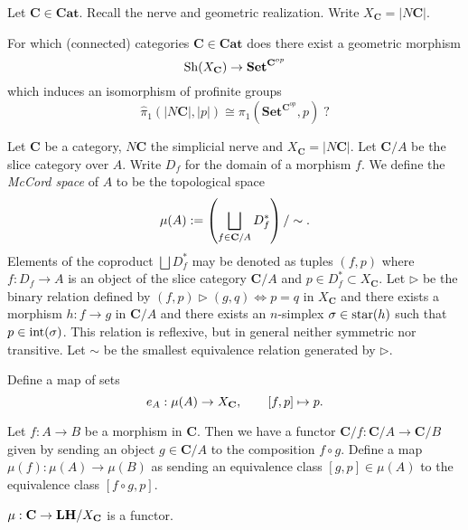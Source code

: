 %
%





Let $\mathbf{C} \in \mathbf{Cat}$. Recall the nerve and geometric realization.
Write $X_\mathbf{C} = |N\mathbf{C}|$.
\begin{question*}
\label{eq:intro-question}
For which (connected) categories $\mathbf{C} \in \mathbf{Cat}$ does there exist a geometric morphism
\[
\operatorname{Sh}(X_{\mathbf{C}}) \to \mathbf{Set}^{\mathbf{C}^{op}}
\]
which induces an isomorphism of profinite groups
\[ \widehat{\pi}_1(|N\mathbf{C}|, |p|) \cong \pi_1\left(\mathbf{Set}^{\mathbf{C}^{op}}, p \right)\; ? \]
\end{question*}

\begin{definition*}
\label{def:star sieve}
Let $\mathbf{C}$ be a category, $N \mathbf{C}$ the simplicial nerve and $X_\mathbf{C} = |N \mathbf{C} |$. Let $\mathbf{C}/A$ be the slice category over $A$. Write $D_f$ for the domain of a morphism $f$. We define the \emph{McCord space} of $A$ to be the topological space
\[ \operatorname{\mu}(A) := \left(\bigsqcup_{f \in \mathbf{C}/A} D_f^* \right) / \sim. \]
Elements of the coproduct $\bigsqcup D_f^*$ may be denoted as tuples $(f,p)$ where $f : D_f \to A$ is an object of the slice category $\mathbf{C}/A$ and $p \in D_f^* \subset X_{\mathbf{C}}$. 
Let $\rhd$ be the binary relation defined by $(f,p) \rhd (g,q) \iff p = q$ in $X_{\mathbf{C}}$ and there exists a morphism $h : f \to g$ in $\mathbf{C}/A$ and there exists an $n$-simplex $\sigma \in \operatorname{star}(h)$ such that $p \in \operatorname{int}(\sigma)$.
This relation is reflexive, but in general neither symmetric nor transitive. Let $\sim$ be the smallest equivalence relation generated by $\rhd$.
\end{definition*}

Define a map of sets
\[ e_A : \operatorname{\mu}(A) \to X_{\mathbf{C}}, \qquad [f,p] \mapsto p. \]

\begin{definition*}
Let $f : A \to B$ be a morphism in $\mathbf{C}$. Then we have a functor $\mathbf{C}/f : \mathbf{C}/A \to \mathbf{C}/B$ given by sending an object $g \in \mathbf{C}/A$ to the composition $f \circ g$. Define a map $\mu(f) : \mu(A) \to \mu(B)$ as sending an equivalence class $[g,p] \in \mu(A)$ to the equivalence class $[f \circ g, p]$.
\end{definition*}

\begin{corollary*}
\label{coro:we have a McCord functor}
$\operatorname{\mu} : \mathbf{C} \to \mathbf{LH}/X_{\mathbf{C}}$ is a functor.
\end{corollary*}

